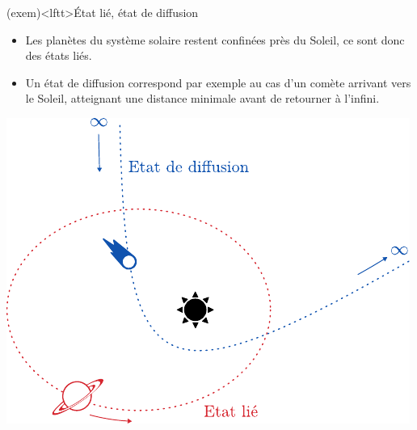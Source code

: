 \documentclass[../../main/main.tex]{subfiles}
\begin{document}
\begin{tcb*}[sidebyside, righthand ratio=.4](exem)<lftt>{État lié, état de diffusion}
	\begin{itemize}
		\item Les planètes du système solaire restent confinées près du Soleil, ce
		      sont donc des états liés.
		\item Un état de diffusion correspond par exemple au cas d'un comète
		      arrivant vers le Soleil, atteignant une distance minimale avant de
		      retourner à l'infini.
	\end{itemize}
	\tcblower
	\begin{center}
		\includegraphics[width=\linewidth]{ep_eff-att_liediff}
	\end{center}
\end{tcb*}

\vspace{-15pt}
\end{document}
